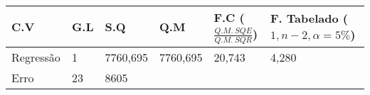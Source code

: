 \documentclass[
]{book}
\begin{document}
\begin{longtable}[]{@{}llllll@{}}
\toprule
\begin{minipage}[b]{0.14\columnwidth}\raggedright
C.V\strut
\end{minipage} & \begin{minipage}[b]{0.14\columnwidth}\raggedright
G.L\strut
\end{minipage} & \begin{minipage}[b]{0.14\columnwidth}\raggedright
S.Q\strut
\end{minipage} & \begin{minipage}[b]{0.14\columnwidth}\raggedright
Q.M\strut
\end{minipage} & \begin{minipage}[b]{0.14\columnwidth}\raggedright
F.C (\(\frac{Q.M. \  SQE}{Q.M.\ SQR}\))\strut
\end{minipage} & \begin{minipage}[b]{0.14\columnwidth}\raggedright
F. Tabelado (\(1,n-2,\alpha=5\%\))\strut
\end{minipage}\tabularnewline
\midrule
\endhead
\begin{minipage}[t]{0.14\columnwidth}\raggedright
Regressão\strut
\end{minipage} & \begin{minipage}[t]{0.14\columnwidth}\raggedright
1\strut
\end{minipage} & \begin{minipage}[t]{0.14\columnwidth}\raggedright
7760,695\strut
\end{minipage} & \begin{minipage}[t]{0.14\columnwidth}\raggedright
7760,695\strut
\end{minipage} & \begin{minipage}[t]{0.14\columnwidth}\raggedright
20,743\strut
\end{minipage} & \begin{minipage}[t]{0.14\columnwidth}\raggedright
4,280\strut
\end{minipage}\tabularnewline
\begin{minipage}[t]{0.14\columnwidth}\raggedright
Erro\strut
\end{minipage} & \begin{minipage}[t]{0.14\columnwidth}\raggedright
23\strut
\end{minipage} & \begin{minipage}[t]{0.14\columnwidth}\raggedright
8605\strut
\end{minipage} & \begin{minipage}[t]{0.14\columnwidth}\raggedright

\end{minipage}
\end{longtable}
\end{document}
